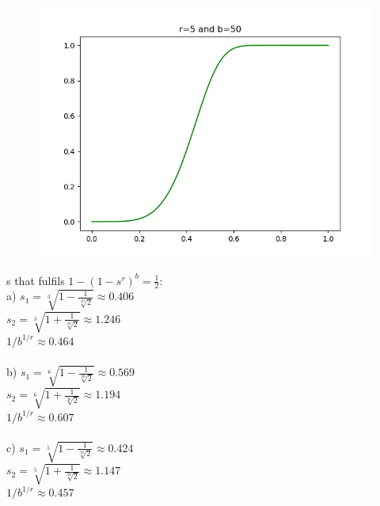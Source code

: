 \documentclass[]{scrartcl}
\begin{document}
\begin{figure}[h!]
	\centering
	\includegraphics[width=0.5\linewidth]{Exercise4_plots/plot_3}
\end{figure}

\vspace{5cm}
s that fulfils $1-(1-s^r)^b = \frac{1}{2}$:\\

a) $ s_1 = \sqrt[3]{1-\frac{1}{\sqrt[10]{2}}} \approx 0.406 $\\
$ s_2 = \sqrt[3]{1+\frac{1}{\sqrt[10]{2}}} \approx 1.246 $\\
$1/b^{1/r} \approx 0.464$\\\\

b) $ s_1 = \sqrt[6]{1-\frac{1}{\sqrt[20]{2}}} \approx 0.569 $\\
$ s_2 = \sqrt[6]{1+\frac{1}{\sqrt[20]{2}}} \approx 1.194 $\\
$1/b^{1/r}\approx 0.607$\\\\

c) $ s_1 = \sqrt[5]{1-\frac{1}{\sqrt[50]{2}}} \approx 0.424 $\\
$ s_2 = \sqrt[5]{1+\frac{1}{\sqrt[50]{2}}} \approx 1.147 $\\
$1/b^{1/r} \approx 0.457$\\\\
\end{document}
